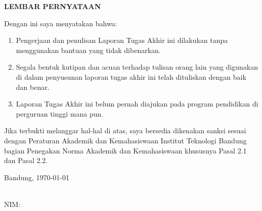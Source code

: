 \clearpage
{}
\begin{center}
  \textbf{\large \MakeUppercase{Lembar Pernyataan}}\\[3em]
\end{center}

Dengan ini saya menyatakan bahwa:

\begin{enumerate}
	\item Pengerjaan dan penulisan Laporan Tugas Akhir ini dilakukan tanpa menggunakan bantuan yang tidak dibenarkan. 
	\item Segala bentuk kutipan dan acuan terhadap tulisan orang lain yang digunakan di dalam penyusunan laporan tugas akhir ini telah dituliskan dengan baik dan benar.
	\item Laporan Tugas Akhir ini belum pernah diajukan pada program pendidikan di perguruan tinggi mana pun. 
\end{enumerate}

Jika terbukti melanggar hal-hal di atas, saya bersedia dikenakan sanksi sesuai dengan Peraturan Akademik dan Kemahasiswaan Institut Teknologi Bandung bagian Penegakan Norma Akademik dan Kemahasiswaan khususnya Pasal 2.1 dan Pasal 2.2.\\
\vfill


Bandung, \today \\
\vspace{2cm}

\theauthor{} \\
NIM:\@\nim{}
